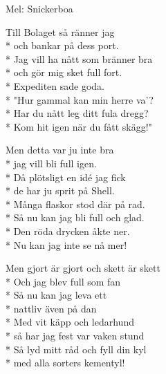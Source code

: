 \pagestyle{Phestvisor}
\begin{SongText}[Bolaget]
    \begin{SongInfo}
        Mel: Snickerboa
    \end{SongInfo}
    \begin{SongVerse}
        Till Bolaget så ränner jag\\*%
        och bankar på dess port.\\*%
        Jag vill ha nått som bränner bra\\*%
        och gör mig sket full fort.\\*%
        Expediten sade goda.\\*%
        "Hur gammal kan min herre va'?\\*%
        Har du nått leg ditt fula dregg?\\*%
        Kom hit igen när du fått skägg!"
    \end{SongVerse}
    \begin{SongVerse}
        Men detta var ju inte bra\\*%
        jag vill bli full igen.\\*%
        Då plötsligt en idé jag fick\\*%
        de har ju sprit på Shell.\\*%
        Många flaskor stod där på rad.\\*%
        Så nu kan jag bli full och glad.\\*%
        Den röda drycken åkte ner.\\*%
        Nu kan jag inte se nå mer! 
    \end{SongVerse}
    \begin{SongVerse}
        Men gjort är gjort och skett är skett\\*%
        Och jag blev full som fan\\*%
        Så nu kan jag leva ett\\*%
        nattliv även på dan\\*%
        Med vit käpp och ledarhund\\*%
        så har jag fest var vaken stund\\*%
        Så lyd mitt råd och fyll din kyl\\*%
        med alla sorters kementyl!
    \end{SongVerse}
\end{SongText}
